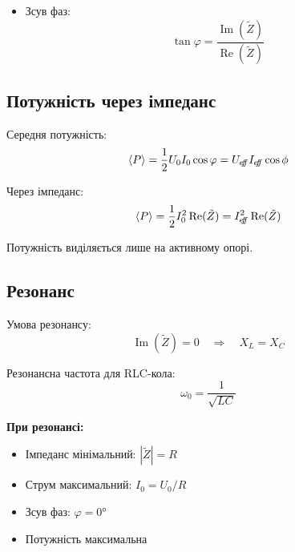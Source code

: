 \begin{Theory}
\begin{itemize}
\begin{itemize}
			      \item  Зсув фаз:
			            \begin{equation}
				            \tan\varphi = \frac{\operatorname{Im}(\tilde{Z})}{\operatorname{Re}(\tilde{Z})}
			            \end{equation}
		      \end{itemize}

	\end{itemize}

	\subsection*{Потужність через імпеданс}

	Середня потужність:
	\begin{equation}
	\langle P \rangle = \frac{1}{2} U_0 I_0 \cos\varphi = U_{e\kern-2.2pt f\kern-3pt f} I_{{e\kern-2.2pt f\kern-3pt f}} \cos\phi
	\end{equation}

	Через імпеданс:
	\begin{equation}
	\langle P \rangle = \frac{1}{2} I_0^2 \operatorname{Re}(\tilde{Z}) = I_{{e\kern-2.2pt f\kern-3pt f}}^2 \operatorname{Re}(\tilde{Z})
	\end{equation}

	Потужність виділяється лише на активному опорі.

	\subsection*{Резонанс}

	Умова резонансу:
	\begin{equation}
	\operatorname{Im}(\tilde{Z}) = 0 \quad \Rightarrow \quad X_L = X_C
	\end{equation}

	Резонансна частота для RLC-кола:
	\begin{equation}
	\omega_0 = \frac{1}{\sqrt{LC}}
	\end{equation}

	\textbf{При резонансі:}
	\begin{itemize}
	\item Імпеданс мінімальний: $|\tilde{Z}| = R$
	\item Струм максимальний: $I_0 = U_0/R$
	\item Зсув фаз: $\varphi = 0°$
	\item Потужність максимальна
	\end{itemize}

\end{Theory}

